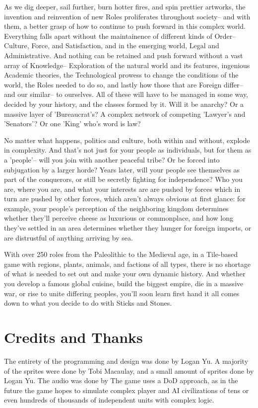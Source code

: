 \documentclass[11pt]{article}
\begin{document}
As we dig deeper, sail further, burn hotter fires, and spin prettier artworks, the invention and reinvention of new Roles proliferates throughout society-- and with them, a better grasp of how to continue to push forward in this complex world. Everything falls apart without the maintainence of different kinds of Order-- Culture, Force, and Satisfaction, and in the emerging world, Legal and Administrative. And nothing can be retained and push forward without a vast array of Knowledge-- Exploration of the natural world and its features, ingenious Academic theories, the Technological prowess to change the conditions of the world, the Roles needed to do so, and lastly how those that are Foreign differ-- and our similar-- to ourselves. All of these will have to be managed in some way, decided by your history, and the classes formed by it. Will it be anarchy? Or a massive layer of 'Bureaucrat's? A complex network of competing 'Lawyer's and 'Senators'?  Or one 'King' who's word is law?

No matter what happens, politics and culture, both within and without, explode in complexity. And that's not just for your people as individuals, but for them as a 'people'-- will you join with another peaceful tribe? Or be forced into subjugation by a larger horde? Years later, will your people see themselves as part of the conquerors, or still be secretly fighting for independence? Who you are, where you are, and what your interests are are pushed by forces which in turn are pushed by other forces, which aren't always obvious at first glance: for example, your people's perception of the neighboring kingdom determines whether they'll perceive cheese as luxurious or commonplace, and how long they've settled in an area determines whether they hunger for foreign imports, or are distrustful of anything arriving by sea.

With over 250 roles from the Paleolithic to the Medieval age, in a Tile-based game with regions, plants, animals, and factions of all types, there is no shortage of what is needed to set out and make your own dynamic history. And whether you develop a famous global cuisine, build the biggest empire, die in a massive war, or rise to unite differing peoples, you'll soon learn first hand it all comes down to what you decide to do with Sticks and Stones. 
\section{Credits and Thanks}
\label{sec:orga3e2bdc}
The entirety of the programming and design was done by Logan Yu. A majority of the sprites were done by Tobi Macaulay, and a small amount of sprites done by Logan Yu. The audio was done by The game uses a DoD approach, as in the future the game hopes to simulate complex player and AI civilizations of tens or even hundreds of thousands of independent units with complex logic. 
\end{document}

